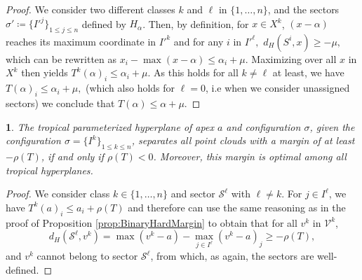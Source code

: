 \documentclass[oneside,UKenglish,a4paper]{amsart}
\numberwithin{equation}{section}
\numberwithin{figure}{section}
\theoremstyle{plain}
\theoremstyle{definition}
\theoremstyle{plain}
\newtheorem{prop}[thm]{\protect\propositionname}
\theoremstyle{remark}
\theoremstyle{plain}
\theoremstyle{definition}
\theoremstyle{definition}
\providecommand{\propositionname}{Proposition}
\begin{document}
\begin{proof}
    We consider two different classes $k$ and $\ell$ in $\{1,\ldots, n\}$, and the sectors $\sigma' \coloneqq \{I'^j\}_{1\le j\le n}$ defined by $H_{\alpha}$. Then, by definition, for $x\in X^k$, $(x-\alpha)$ reaches its maximum coordinate in $I'^k$ and for any $i$ in $I'^{\ell},$ 
    $d_H(S^i,x) \ge - \mu,$ which can be rewritten as $x_i - \max(x-\alpha) \le \alpha_i + \mu.$ Maximizing over all $x$ in $X^k$ then yields $T^k(\alpha)_i \le \alpha_i + \mu.$ As this holds for all $k\ne \ell$ at least, we have $T(\alpha)_i \le \alpha_i + \mu,$ (which also holds for $\ell =0$, i.e when we consider unassigned sectors) we conclude that $T(\alpha)\le \alpha + \mu.$
\end{proof}

\begin{prop}\label{prop:MultiClass}
The tropical parameterized hyperplane of apex $a$ and configuration $\sigma$,
given the configuration $\sigma=\{I^{k}\}_{1\le k\le n}$, separates all point clouds with a margin of at least $-\rho(T)$, if and only if $\rho(T) < 0$.
Moreover, this margin is optimal among all tropical hyperplanes.

\end{prop}

\begin{proof}
We consider class $k\in\{1,\ldots, n\}$ and sector $\mathcal{S}^\ell$ with $\ell \ne k$. For $j \in I^{\ell}$, we have $T^{k}(a)_i\le a_i + \rho(T)$ and therefore can use the same reasoning
as in the proof of Proposition \ref{prop:BinaryHardMargin} to obtain that for all $v^{k}$ in $\mathcal{V}^{k}$,
\[
d_H(\mathcal{S}^\ell,v^{k})=\max(v^{k}-a)-\max_{j\in I^{\ell}}(v^{k}-a)_j\ge-\rho(T),
\]
and $v^k$ cannot belong to sector $\mathcal{S}^\ell$, from which, as again, the sectors are well-defined.
\end{proof}


\end{document}
